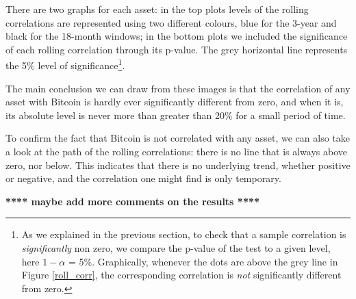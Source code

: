 There are two graphs for each asset: in the top plots levels of the rolling correlations are represented using two different colours, blue for the 3-year and black for the 18-month windows; in the bottom plots we included the significance of each rolling correlation through its p-value. The grey horizontal line represents the 5\% level of significance\footnote{As we explained in the previous section, to check that a sample correlation is \textit{significantly} non zero, we compare the p-value of the test to a given level, here $1- \alpha$ = 5\%. Graphically, whenever the dots are above the grey line in Figure \ref{roll_corr}, the corresponding correlation is \textit{not} significantly different from zero.}. 

The main conclusion we can draw from these images is that the correlation of any asset with Bitcoin is hardly ever significantly different from zero, and when it is, its absolute level is never more than greater than 20\% for a small period of time.

To confirm the fact that Bitcoin is not correlated with any asset, we can also take a look at the path of the rolling correlations: there is no line that is always above zero, nor below. This indicates that there is no underlying trend, whether positive or negative, and the correlation one might find is only temporary.

\textbf{**** maybe add more comments on the results ****}




